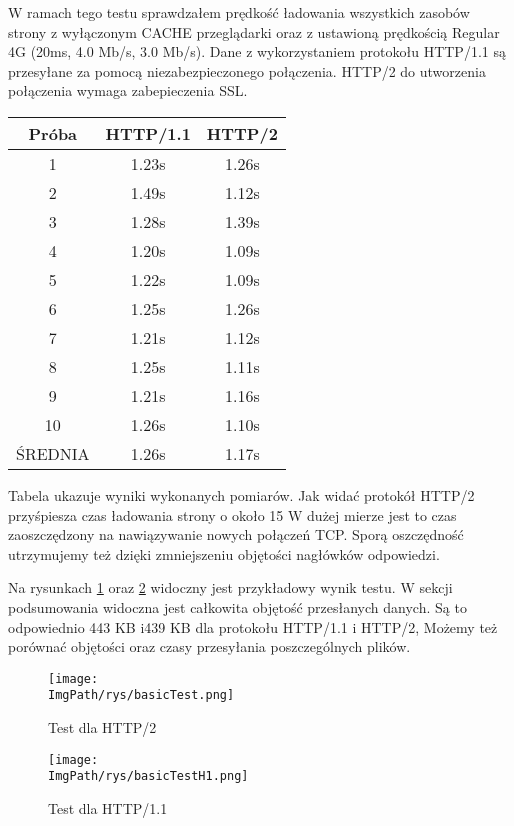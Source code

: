 \documentclass[a4paper,12pt,twoside,openany]{report}
\newcommand{\ImgPath}{.}
\begin{document}
W ramach tego testu sprawdzałem prędkość ładowania wszystkich zasobów strony z wyłączonym CACHE przeglądarki oraz z ustawioną prędkością Regular 4G (20ms, 4.0 Mb/s, 3.0 Mb/s).
Dane z wykorzystaniem protokołu HTTP/1.1 są przesyłane za pomocą niezabezpieczonego połączenia.
HTTP/2 do utworzenia połączenia wymaga zabepieczenia SSL.

\begin{tabular}{c|c|c}
Próba & HTTP/1.1 & HTTP/2 \\ \hline
1 & 1.23s & 1.26s\\
2 & 1.49s & 1.12s\\
3 & 1.28s & 1.39s\\
4 & 1.20s & 1.09s\\
5 & 1.22s & 1.09s\\
6 & 1.25s & 1.26s\\
7 & 1.21s & 1.12s\\
8 & 1.25s & 1.11s\\
9 & 1.21s & 1.16s\\
10 & 1.26s & 1.10s\\ \hline
ŚREDNIA & 1.26s & 1.17s\\
\end{tabular}

Tabela ukazuje wyniki wykonanych pomiarów.
Jak widać protokół HTTP/2 przyśpiesza czas ładowania strony o około 15%
W dużej mierze jest to czas zaoszczędzony na nawiązywanie nowych połączeń TCP.
Sporą oszczędność utrzymujemy też dzięki zmniejszeniu objętości nagłówków odpowiedzi.

Na rysunkach \ref{schematBasicTest} oraz \ref{schematBasicTestH1} widoczny jest przykładowy wynik testu.
W sekcji podsumowania widoczna jest całkowita objętość przesłanych danych. Są to odpowiednio 443 KB i439 KB dla protokołu HTTP/1.1 i HTTP/2,
Możemy też porównać objętości oraz czasy przesyłania poszczególnych plików.

\begin{figure}[!htbp]
	\begin{center}
\centering
\texttt{[image: \\ImgPath/rys/basicTest.png]}
\end{center}
	\caption{Test dla HTTP/2}
	\label{schematBasicTest}
\end{figure}

\begin{figure}[!htbp]
	\begin{center}
\centering
\texttt{[image: \\ImgPath/rys/basicTestH1.png]}
\end{center}
	\caption{Test dla HTTP/1.1}
	\label{schematBasicTestH1}
\end{figure}
\end{document}
